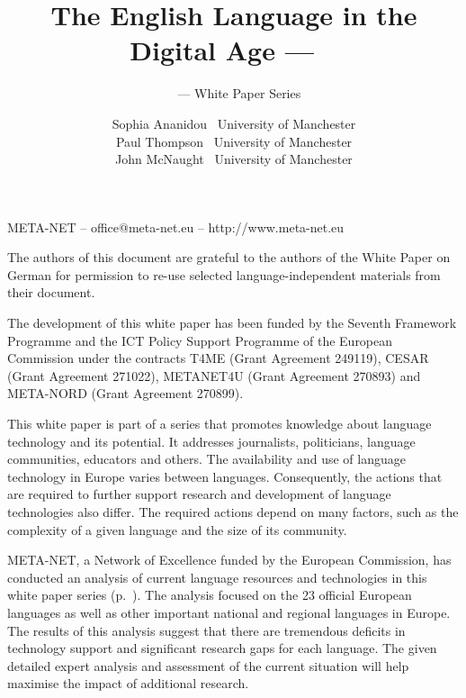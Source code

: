 \documentclass[]{../../metanetpaper}
\title{The English Language in the Digital Age --- ~}
\subtitle{~ --- White Paper Series}
\author{
  Sophia Ananidou~ {\small University of Manchester}\\
  Paul Thompson~ {\small University of Manchester}\\
  John McNaught~ {\small University of Manchester}
}
\begin{document}
\maketitle
\null
\pagestyle{empty} 

\centerline{META-NET -- office@meta-net.eu -- http://www.meta-net.eu}

\vfill



\begin{small}
  The authors of this document are grateful to the authors of the White Paper on German for permission to re-use selected language-independent materials from their document.  
\end{small}



\bigskip
\begin{small}
  The development of this white paper has been funded by the Seventh
  Framework Programme and the ICT Policy Support Programme of the
  European Commission under the contracts T4ME (Grant Agreement 249119),
  CESAR (Grant Agreement 271022), METANET4U (Grant Agreement 270893)
  and META-NORD (Grant Agreement 270899).
\end{small}

\clearpage

\setcounter{page}{5}
\pagestyle{scrheadings}

\cleardoublepage


This white paper is part of a series that promotes knowledge about language technology and its potential. It addresses journalists, politicians, language communities, educators and others. 
The availability and use of language technology in Europe varies between languages. Consequently, the actions that are required to further support research and development of language technologies also differ. The required actions depend on many factors, such as the complexity of a given language and the size of its community.

\bigskip
META-NET, a Network of Excellence funded by the European Commission, has conducted an  analysis of current language resources and technologies in this white paper series (p.~\pageref{whitepaperseries}). The analysis focused on the 23 official European languages as well as other important national and regional languages in Europe. The results of this analysis suggest that there are tremendous deficits in technology support and significant research gaps for each language. The given detailed expert analysis and assessment of the current situation will help maximise the impact of additional research.
\end{document}
